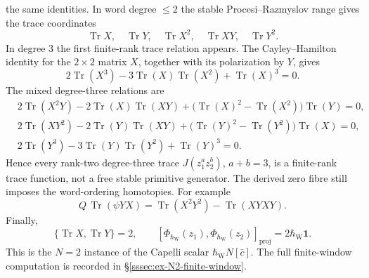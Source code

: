 \documentclass[11pt]{memoir}
\begin{document}
\begin{ex}[Two Dirac branes, generic commuting pair, \(N=2\)]
	  the same identities.
  In word degree \(\leq2\) the stable Procesi--Razmyslov range gives the
  trace coordinates
  \[
    \operatorname{Tr}X,\quad \operatorname{Tr}Y,\quad
    \operatorname{Tr}X^2,\quad \operatorname{Tr}XY,\quad
    \operatorname{Tr}Y^2 .
  \]
  In degree \(3\) the first finite-rank trace relation appears.  The
  Cayley--Hamilton identity for the \(2\times2\) matrix \(X\), together
  with its polarization by \(Y\), gives
  \[
    2\operatorname{Tr}(X^3)
    -3\operatorname{Tr}(X)\operatorname{Tr}(X^2)
    +\operatorname{Tr}(X)^3=0.
  \]
  The mixed degree-three relations are
  \[
  \begin{aligned}
    &2\operatorname{Tr}(X^2Y)
      -2\operatorname{Tr}(X)\operatorname{Tr}(XY)
      +\bigl(\operatorname{Tr}(X)^2-\operatorname{Tr}(X^2)\bigr)
       \operatorname{Tr}(Y)=0,\\
    &2\operatorname{Tr}(XY^2)
      -2\operatorname{Tr}(Y)\operatorname{Tr}(XY)
      +\bigl(\operatorname{Tr}(Y)^2-\operatorname{Tr}(Y^2)\bigr)
       \operatorname{Tr}(X)=0,\\
    &2\operatorname{Tr}(Y^3)
      -3\operatorname{Tr}(Y)\operatorname{Tr}(Y^2)
      +\operatorname{Tr}(Y)^3=0 .
  \end{aligned}
  \]
  Hence every rank-two degree-three trace \(J(z_1^az_2^b)\),
  \(a+b=3\), is a finite-rank trace function, not a free stable
  primitive generator.  The derived zero fibre still imposes the
  word-ordering homotopies.  For example
  \[
    Q\,\operatorname{Tr}(\psi YX)
    =
    \operatorname{Tr}(X^2Y^2)-\operatorname{Tr}(XYXY).
  \]
  Finally,
  \[
    \{\operatorname{Tr}X,\operatorname{Tr}Y\}=2,\qquad
    [\Phi_{\hbar_{\mathrm{W}}}(z_1),
     \Phi_{\hbar_{\mathrm{W}}}(z_2)]_{\mathrm{proj}}
      =2\hbar_{\mathrm{W}}\mathbf 1 .
  \]
  This is the \(N=2\) instance of the Capelli scalar
  \(\hbar_{\mathrm{W}}N[\bar c]\).  The full finite-window computation is recorded
  in \S\ref{sssec:ex-N2-finite-window}.
\end{ex}
\end{document}
